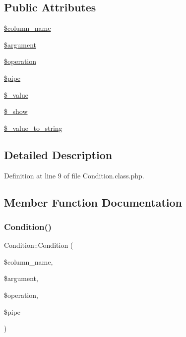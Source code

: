 \subsection*{Public Attributes}
\begin{DoxyCompactItemize}
\item 
\hyperlink{classCondition_ae34f9b605299c7142f5c9daa61b338fe}{\$column\+\_\+name}
\item 
\hyperlink{classCondition_ab2171308c722d4d35f37369762d78175}{\$argument}
\item 
\hyperlink{classCondition_aa8fbf3bdbbea0c57d3822ac585eb75a4}{\$operation}
\item 
\hyperlink{classCondition_a19b2472b462fc19e44b8fcbf1898b9cc}{\$pipe}
\item 
\hyperlink{classCondition_af8fed5d1250eb545d782e80478dac4fe}{\$\+\_\+value}
\item 
\hyperlink{classCondition_ae631b5f7e9a50ca781bd034edaf5e059}{\$\+\_\+show}
\item 
\hyperlink{classCondition_afcfd7fce951a699f3b065e227dbbacc9}{\$\+\_\+value\+\_\+to\+\_\+string}
\end{DoxyCompactItemize}


\subsection{Detailed Description}


Definition at line 9 of file Condition.\+class.\+php.



\subsection{Member Function Documentation}
\hypertarget{classCondition_aaf108d388895d9fe832a52e5586c0ecb}{}\label{classCondition_aaf108d388895d9fe832a52e5586c0ecb} 
\subsubsection{\texorpdfstring{Condition()}{Condition()}}
{\footnotesize\ttfamily Condition\+::\+Condition (\begin{DoxyParamCaption}\item[{}]{\$column\+\_\+name,  }\item[{}]{\$argument,  }\item[{}]{\$operation,  }\item[{}]{\$pipe }\end{DoxyParamCaption})}

